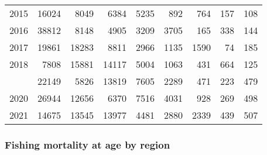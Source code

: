 \documentclass[
]{article}
\begin{document}
\begin{longtable}[t]{lrrrrrrrr}
2015 & 16024 & 8049 & 6384 & 5235 & 892 & 764 & 157 & 108\\
2016 & 38812 & 8148 & 4905 & 3209 & 3705 & 165 & 338 & 144\\
2017 & 19861 & 18283 & 8811 & 2966 & 1135 & 1590 & 74 & 185\\
2018 & 7808 & 15881 & 14117 & 5004 & 1063 & 431 & 664 & 125\\
\addlinespace
2019 & 22149 & 5826 & 13819 & 7605 & 2289 & 471 & 223 & 479\\
2020 & 26944 & 12656 & 6370 & 7516 & 4031 & 928 & 269 & 498\\
2021 & 14675 & 13545 & 13977 & 4481 & 2880 & 2339 & 439 & 507\\*
\end{longtable}

\hypertarget{fishing-mortality-at-age-by-region}{%
\subsubsection{Fishing mortality at age by
region}\label{fishing-mortality-at-age-by-region}}
\end{document}
